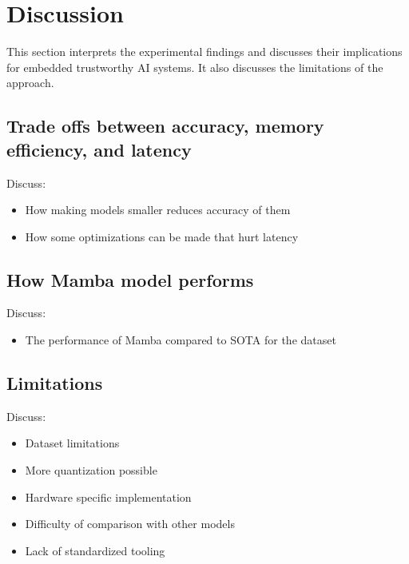 \section{Discussion}

This section interprets the experimental findings and discusses their implications for embedded trustworthy AI systems. It also discusses the limitations of the approach.

\subsection{Trade offs between accuracy, memory efficiency, and latency}

Discuss:
\begin{itemize}
  \item How making models smaller reduces accuracy of them
  \item How some optimizations can be made that hurt latency
\end{itemize}

\subsection{How Mamba model performs}

Discuss:
\begin{itemize}
  \item The performance of Mamba compared to SOTA for the dataset
\end{itemize}

\subsection{Limitations}

Discuss:
\begin{itemize}
  \item Dataset limitations
  \item More quantization possible
  \item Hardware specific implementation
  \item Difficulty of comparison with other models
  \item Lack of standardized tooling
\end{itemize}
